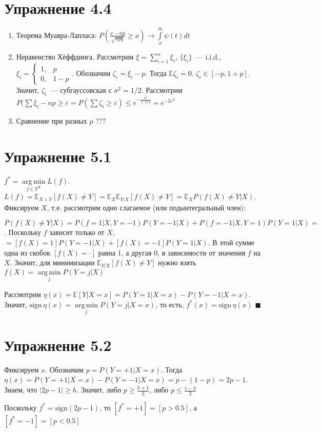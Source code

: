 \documentclass[a4paper]{article}
\DeclareMathOperator*{\argmin}{arg\,min}
\def\eps{\varepsilon}
\begin{document}
\section*{Упражнение 4.4}
\begin{enumerate}
\item Теорема Муавра-Лапласа: $P(\frac{x-np}{\sqrt{npq}}\geqslant x)\to\int\limits_x^\infty \psi(t)dt$
\item Неравенство Хёффдинга. Рассмотрим $\xi=\sum\limits_{i=1}^n \xi_i$, $\{\xi_i\}$~--- i.i.d., $\xi_i=\begin{cases}
1,&p\\
0,&1-p
\end{cases}$. Обозначим $\zeta_i=\xi_i-p$. Тогда $\mathbb{E}\zeta_i=0$. $\zeta_i\in[-p,1+p]$. Значит, $\zeta_i$~--- субгауссовская с $\sigma^2=1/2$. Рассмотрим $P(\sum \xi_i-np\geqslant \eps=P(\sum \zeta_i\geqslant \eps)\leqslant e^{-\frac{\eps^2}{2\cdot 1/4}}=e^{-2\eps^2}$
\item Сравнение при разных $p$ ???
\end{enumerate}
\section*{Упражнение 5.1}
$f^*=\argmin\limits_{f\in Y^X} L(f)$. $L(f)=\mathbb{E}_{X\times Y}[f(X)\neq Y]=\mathbb{E}_X\mathbb{E}_{Y|X}[f(X)\neq Y]=\mathbb{E}_X P(f(X)\neq Y\big| X)$. Фиксируем $X$, т.е. рассмотрим одно слагаемое (или подынтегральный член):

$P(f(X)\neq Y\big|X)=P(f=1\big| X,Y=-1)P(Y=-1\big|X)+P(f=-1\big| X,Y=1)P(Y=1\big|X)\boxed{=}$. Поскольку $f$ зависит только от $X$, $\boxed{=}[f(X)=1]P(Y=-1\big|X)+[f(X)=-1]P(Y=1\big|X)$. В этой сумме одна из скобок $[f(X)=\cdot]$ равна 1, а другая 0, в зависимости от значения $f$ на $X$. Значит, для минимизации $\mathbb{E}_{Y|X}[f(X)\neq Y]$ нужно взять $f(X)=\argmin\limits_j P(Y=j\big|X)$

Рассмотрим $\eta(x)=\mathbb{E}[Y|X=x]=P(Y=1\big|X=x)-P(Y=-1\big| X=x)$. Значит, $\mbox{sign}\,\eta(x)=\argmin\limits_j P(Y=j\big| X=x)$, то есть, $f^*(x)=\mbox{sign}\,\eta(x)$ $\blacksquare$
\section*{Упражнение 5.2}
Фиксируем $x$. Обозначим $p=P(Y=+1|X=x)$. Тогда $\eta(x)=P(Y=+1|X=x)-P(Y=-1|X=x)=p-(1-p)=2p-1$. Знаем, что $|2p-1|\geqslant h$. Значит, либо $p\geqslant\frac{h+1}{2}$, либо $p\leqslant \frac{1-h}{2}$

Поскольку $f^*=\mbox{sign}(2p-1)$, то $[f^*=+1]=[p>0.5]$, а $[f^*=-1]=[p<0.5]$
\end{document}
